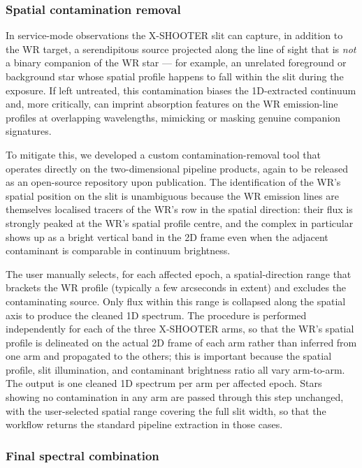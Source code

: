 \subsubsection{Spatial contamination removal}
\label{sec:contamination_removal}

In service-mode observations the X-SHOOTER slit can capture, in addition
to the WR target, a serendipitous source projected along the line of
sight that is \emph{not} a binary companion of the WR star --- for
example, an unrelated foreground or background star whose spatial
profile happens to fall within the slit during the exposure. If left
untreated, this contamination biases the 1D-extracted continuum and,
more critically, can imprint absorption features on the WR
emission-line profiles at overlapping wavelengths, mimicking or masking
genuine companion signatures.

To mitigate this, we developed a custom contamination-removal tool that
operates directly on the two-dimensional pipeline products, again to
be released as an open-source repository upon publication. The
identification of the WR's spatial position on the slit is unambiguous
because the WR emission lines are themselves localised tracers of the
WR's row in the spatial direction: their flux is strongly peaked at the
WR's spatial profile centre, and the \primaryline complex in particular
shows up as a bright vertical band in the 2D frame even when the
adjacent contaminant is comparable in continuum brightness.

The user manually selects, for each affected epoch, a spatial-direction
range that brackets the WR profile (typically a few arcseconds in
extent) and excludes the contaminating source. Only flux within this
range is collapsed along the spatial axis to produce the cleaned 1D
spectrum. The procedure is performed independently for each of the
three X-SHOOTER arms, so that the WR's spatial profile is delineated
on the actual 2D frame of each arm rather than inferred from one arm
and propagated to the others; this is important because the spatial
profile, slit illumination, and contaminant brightness ratio all vary
arm-to-arm. The output is one cleaned 1D spectrum per arm per affected
epoch. Stars showing no contamination in any arm are passed through
this step unchanged, with the user-selected spatial range covering the
full slit width, so that the workflow returns the standard pipeline
extraction in those cases.

\subsubsection{Final spectral combination}
\label{sec:stitch_final}

